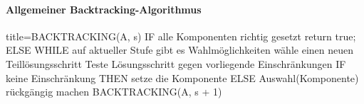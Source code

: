 \documentclass[
    ngerman,
    color=3b,
    dark_mode,
    load_common, %
    summary,
    boxarc,
]{tuda_summary}
\begin{document}
\paragraph{Allgemeiner Backtracking-Algorithmus}\mbox{}
\begin{codeBlock}[autogobble]{title={BACKTRACKING(A, s)}}
    IF alle Komponenten richtig gesetzt
        return true;
    ELSE
        WHILE auf aktueller Stufe gibt es Wahlmöglichkeiten
            wähle einen neuen Teillösungsschritt
            Teste Lösungsschritt gegen vorliegende Einschränkungen
            IF keine Einschränkung THEN
                setze die Komponente
            ELSE
                Auswahl(Komponente) rückgängig machen
            BACKTRACKING(A, s + 1)
\end{codeBlock}

\clearpage
\end{document}
